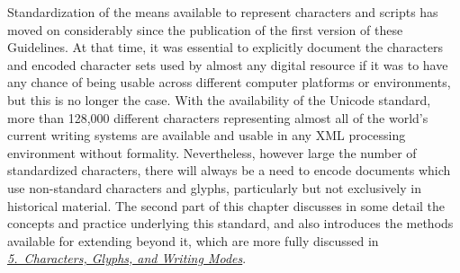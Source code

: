 Standardization of the means available to represent characters and scripts has moved on considerably since the publication of the first version of these Guidelines. At that time, it was essential to explicitly document the characters and encoded character sets used by almost any digital resource if it was to have any chance of being usable across different computer platforms or environments, but this is no longer the case. With the availability of the Unicode standard, more than 128,000 different characters representing almost all of the world's current writing systems are available and usable in any XML processing environment without formality. Nevertheless, however large the number of standardized characters, there will always be a need to encode documents which use non-standard characters and glyphs, particularly but not exclusively in historical material. The second part of this chapter discusses in some detail the concepts and practice underlying this standard, and also introduces the methods available for extending beyond it, which are more fully discussed in \textit{\hyperref[WD]{5.\ Characters, Glyphs, and Writing Modes}}.
